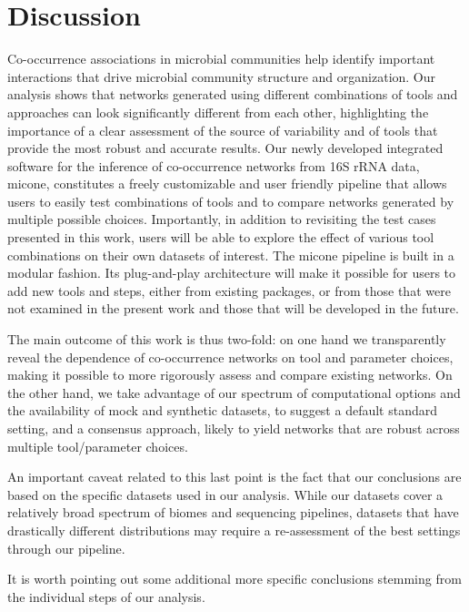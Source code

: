 
\section*{Discussion}

Co-occurrence associations in microbial communities help identify important interactions that drive microbial community structure and organization.
Our analysis shows that networks generated using different combinations of tools and approaches can look significantly different from each other, highlighting the importance of a clear assessment of the source of variability and of tools that provide the most robust and accurate results.
Our newly developed integrated software for the inference of co-occurrence networks from 16S rRNA data, \ac{micone}, constitutes a freely customizable and user friendly pipeline that allows users to easily test combinations of tools and to compare networks generated by multiple possible choices.
Importantly, in addition to revisiting the test cases presented in this work, users will be able to explore the effect of various tool combinations on their own datasets of interest.
The \ac{micone} pipeline is built in a modular fashion.
Its plug-and-play architecture will make it possible for users to add new tools and steps, either from existing packages, or from those that were not examined in the present work and those that will be developed in the future.

The main outcome of this work is thus two-fold: on one hand we transparently reveal the dependence of co-occurrence networks on tool and parameter choices, making it possible to more rigorously assess and compare existing networks.
On the other hand, we take advantage of our spectrum of computational options and the availability of mock and synthetic datasets, to suggest a default standard setting, and a consensus approach, likely to yield networks that are robust across multiple tool/parameter choices.

An important caveat related to this last point is the fact that our conclusions are based on the specific datasets used in our analysis.
While our datasets cover a relatively broad spectrum of biomes and sequencing pipelines, datasets that have drastically different distributions may require a re-assessment of the best settings through our pipeline.

It is worth pointing out some additional more specific conclusions stemming from the individual steps of our analysis.

